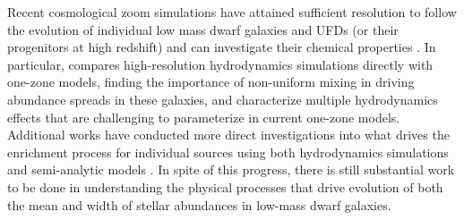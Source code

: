 \documentclass[twocolumn]{aastex62}
\begin{document}
Recent cosmological zoom simulations have attained sufficient resolution to follow the evolution of individual low mass dwarf galaxies and UFDs (or their progenitors at high redshift) and can investigate their chemical properties \citep{Jeon2017,Maccio2017,Christensen2018,Corlies2018,Escala2018,Munshi2018,RevazJablonka2018,wheeler2019,Agertz2019}. 
In particular, \cite{Cote2018} compares high-resolution hydrodynamics simulations directly with one-zone models, finding the importance of non-uniform mixing in driving abundance spreads in these galaxies, and characterize multiple hydrodynamics effects that are challenging to parameterize in current one-zone models. Additional works have conducted more direct investigations into what drives the enrichment process for individual sources using both hydrodynamics simulations \citep{PanScannapiecoScalo2013,Ritter2015,Safarzadeh2017,Hirai2015,Hirai2017,Emerick2018b,HaynesKobayashi2019} and semi-analytic models \citep[e.g.][]{KrumholzTing2018}. 
In spite of this progress, there is still substantial work to be done in understanding the physical processes that drive evolution of both the mean and width of stellar abundances in low-mass dwarf galaxies.
\end{document}
